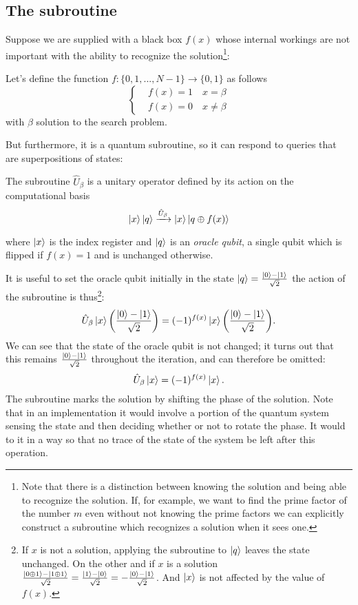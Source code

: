 \subsection{The subroutine}\label{sec:subroutine}
Suppose we are supplied with a black box $f(x)$ whose internal workings are not important with the ability to recognize the solution\footnote{Note that there is a distinction between knowing the solution and being able to recognize the solution. If, for example, we want to find the prime factor of the number $m$ even without not knowing the prime factors we can explicitly construct a subroutine which recognizes a solution when it sees one.}:
\begin{defn}
Let's define the function $f: \{0,1,...,N-1\} \rightarrow \{0,1\}$ as follows
\begin{equation*}
    \begin{cases}
&f(x) = 1   \quad  x=\beta \\
&f(x) = 0   \quad x\neq\beta
\end{cases}
\end{equation*}
with $\beta$ solution to the search problem.
\end{defn}
But furthermore, it is a quantum subroutine, so it can respond to queries that are superpositions of states:
\begin{defn}
The subroutine $\hat{U}_\beta$ is a unitary operator defined by its action on the computational basis
\begin{equation*}
    \ket{x}\ket{q} \xrightarrow{\hat{U}_\beta} \ket{x} \ket{q \oplus f(x)}
\end{equation*}
\end{defn}
where $\ket{x}$ is the index register and $\ket{q}$ is an \emph{oracle qubit}, a single qubit which is flipped if $f(x) = 1$ and is unchanged otherwise.

It is useful to set the oracle qubit initially in the state $\ket{q} = \frac{\ket{0}-\ket{1}}{\sqrt{2}}$ the action of the subroutine is thus\footnote{If $x$ is not a solution, applying the subroutine to $\ket{q}$ leaves the state unchanged. On the other and if $x$ is a solution $\frac{\ket{0 \oplus 1} - \ket{1 \oplus 1}}{\sqrt{2}} = \frac{\ket{1}-\ket{0}}{\sqrt{2}} = - \frac{\ket{0}-\ket{1}}{\sqrt{2}}$. And $\ket{x}$ is not affected by the value of $f(x)$.}:
\begin{equation*}
    \hat{U}_\beta \ket{x} \biggl(\frac{\ket{0}-\ket{1}}{\sqrt{2}}\biggr) = (-1)^{f(x)} \ket{x} \biggl(\frac{\ket{0}-\ket{1}}{\sqrt{2}}\biggr).
\end{equation*}
We can see that the state of the oracle qubit is not changed; it turns out that this remains  $\frac{\ket{0}-\ket{1}}{\sqrt{2}}$ throughout the iteration, and can therefore be omitted:
\begin{equation*}
    \hat{U}_\beta \ket{x} = (-1)^{f(x)} \ket{x}.
\end{equation*}
The subroutine marks the solution by shifting the phase of the solution. Note that in an implementation it would involve a portion of the quantum system sensing the state and then deciding whether or not to rotate the phase. It would to it in a way so that no trace of the state of the system be left after this operation.
